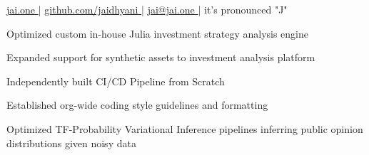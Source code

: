 \documentclass[]{resume}
\begin{document}
%
%
\lastupdated
\github

%
%
{ 
    \href{http://jai.one }{jai.one }|
    \href{http://github.com/jaidhyani}{ github.com/jaidhyani }|
    \href{mailto:jai@jai.one}{ jai@jai.one }|
    it's pronounced "J"
}

%
%



%
%


\hfill
\begin{minipage}[t]{1.0\textwidth}







\vspace{\topsep} %

\begin{tightemize}
    \item Optimized custom in-house Julia investment strategy analysis engine
    \item Expanded support for synthetic assets to investment analysis platform
    \columnbreak
    \item Independently built CI/CD Pipeline from Scratch
    \item Established org-wide coding style guidelines and formatting
\end{tightemize}


\begin{tightemize}
    \item Optimized TF-Probability Variational Inference pipelines inferring public opinion distributions given noisy data
    

\end{tightemize}
\end{minipage}
\end{document}

